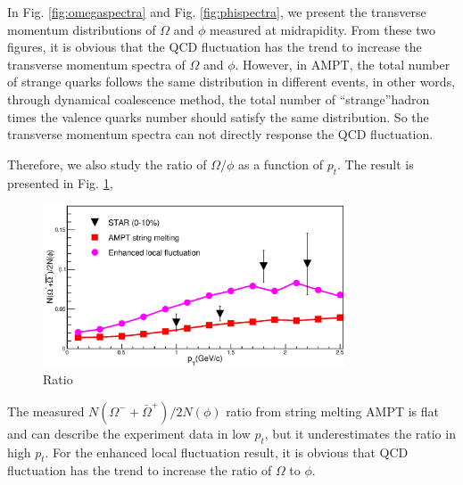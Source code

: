 \documentclass[11pt,a4paper,openany]{article}
\begin{document}
In Fig. \ref{fig:omegaspectra} and Fig. \ref{fig:phispectra}, we present the transverse momentum
distributions of $\Omega$ and $\phi$
measured at midrapidity. From these two figures, it is obvious that the QCD fluctuation has the
trend to increase the transverse momentum spectra of $\Omega$ and $\phi$. However, in AMPT, the
total number of strange quarks follows the same distribution in different events, in other words,
through dynamical coalescence method, the total number of
\textquotedblleft{strange}\textquotedblright hadron times the valence quarks number should satisfy
the same distribution. So the transverse momentum spectra can not directly response the QCD
fluctuation.
\par
Therefore, we also study the ratio of $\Omega/\phi$ as a function of $p_t$. The result is presented
in Fig. \ref{fig:ratio}, 
\begin{figure}[!h]
  \centering
  \includegraphics[width=0.8\textwidth]{./figure/Ratio.eps}
  \caption{Ratio}
  \label{fig:ratio}
\end{figure}
The measured $N(\Omega^{-}+\bar{\Omega}^{+})/2N(\phi)$ ratio from string melting  AMPT is flat and 
can describe the experiment data in low $p_t$, but it underestimates the ratio in high $p_{t}$. For 
the enhanced local fluctuation result, it is obvious that QCD fluctuation has the trend to increase
the ratio of $\Omega$ to $\phi$.
\end{document}
